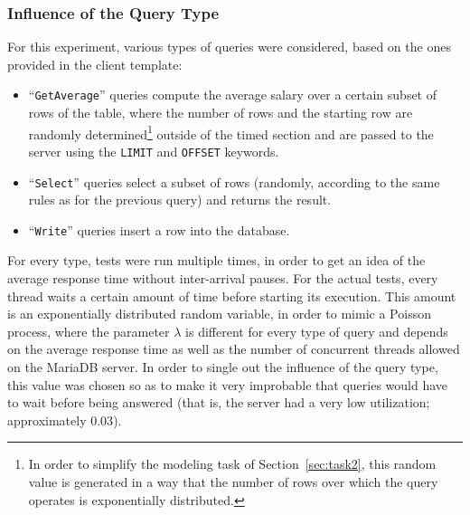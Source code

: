 \documentclass[journal]{IEEEtran}
\theoremstyle{definition}
\newcommand{\java}[1]{\texttt{#1}}
\newcommand{\sql}[1]{\texttt{#1}}
\begin{document}
\subsubsection{Influence of the Query Type}
For this experiment, various types of queries were considered, based on the ones provided in the client template:
\begin{itemize}
	\item ``\java{GetAverage}'' queries compute the average salary over a certain subset of rows of the table, where the number of rows and the starting row are randomly determined\footnote{In order to simplify the modeling task of Section~\ref{sec:task2}, this random value is generated in a way that the number of rows over which the query operates is exponentially distributed.} outside of the timed section and are passed to the server using the \sql{LIMIT} and \sql{OFFSET} keywords.
	\item ``\java{Select}'' queries select a subset of rows (randomly, according to the same rules as for the previous query) and returns the result.
	\item ``\java{Write}'' queries insert a row into the database.
\end{itemize}

For every type, tests were run multiple times, in order to get an idea of the average response time without inter-arrival pauses.
For the actual tests, every thread waits a certain amount of time before starting its execution.
This amount is an exponentially distributed random variable, in order to mimic a Poisson process, where the parameter \(\lambda\) is different for every type of query and depends on the average response time as well as the number of concurrent threads allowed on the MariaDB server.
In order to single out the influence of the query type, this value was chosen so as to make it very improbable that queries would have to wait before being answered (that is, the server had a very low utilization; approximately \(0.03\)).
\end{document}
